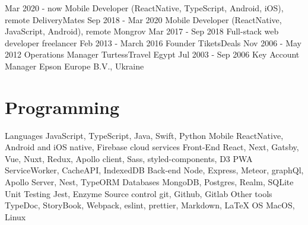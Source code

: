 \documentclass[letterpaper]{twentysecondcv} %
\begin{document}
\begin{twenty} %
	\twentyitem
    	{Mar 2020} 
        {- now}
        {Mobile Developer (ReactNative, TypeScript, Android, iOS), remote}
        {}
        {DeliveryMates}
        {}	
	\twentyitem
    	{Sep 2018} 
        {- Mar 2020}
        {Mobile Developer (ReactNative, JavaScript, Android), remote}
        {}
        {Mongrov}
        {}
    \twentyitem
    	{Mar 2017}
        {- Sep 2018}
        {Full-stack web developer}
        {}
        {freelancer}
        {}
	\twentyitem
    	{Feb 2013}
        {- March 2016}
        {Founder}
        {}
        {TiketsDeals}
        {}
    \twentyitem
    	{Nov 2006}
        {- May 2012}
        {Operations Manager}
        {}
        {TurtessTravel Egypt}
        {}
    \twentyitem
    	{Jul 2003}
        {- Sep 2006}
        {Key Account Manager}
        {}
        {Epson Europe B.V., Ukraine}
        {}
\end{twenty}


\section{Programming}
\begin{twentyshort} %
    \twentyitemshort
    	{Languages}
    		{JavaScript, TypeScript, Java, Swift, Python}
    \twentyitemshort
    	{Mobile}
        {ReactNative, Android and iOS native, Firebase cloud services}
    \twentyitemshort
    	{Front-End}
        {React, Next, Gatsby, Vue, Nuxt, Redux, Apollo client, Sass, styled-components, D3}
    \twentyitemshort
    	{PWA}
        {ServiceWorker, CacheAPI, IndexedDB}
     \twentyitemshort
    	{Back-end}
		{Node, Express, Meteor, graphQl, Apollo Server, Nest, TypeORM}
     \twentyitemshort
    	{Databases}
		{MongoDB, Postgres, Realm, SQLite}
     \twentyitemshort
    	{Unit Testing}
		{Jest, Enzyme}
     \twentyitemshort
    	{Source control}
		{git, Github, Gitlab}
     \twentyitemshort
    	{Other tools}
		{TypeDoc, StoryBook, Webpack, eslint, prettier, Markdown, \LaTeX}
    \twentyitemshort
    	{OS}
		{MacOS, Linux}
\end{twentyshort}
\end{document}
